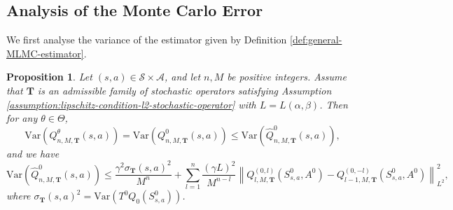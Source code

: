 \documentclass[11pt]{article}
\numberwithin{equation}{section}
\newtheorem{proposition}[theorem]{Proposition}
\theoremstyle{definition}
\theoremstyle{remark}
\begin{document}
\subsection{Analysis of the Monte Carlo Error}
\label{subsection:analysis-mc-error}
We first analyse the variance of the estimator given by Definition \ref{def:general-MLMC-estimator}.
\begin{proposition}
    \label{prop:variance-monte-carlo}
    Let $(s,a) \in \mathcal S \times \mathcal A$, and let $n,M$ be positive integers. Assume that $\mathbf T$ is an admissible family of stochastic operators satisfying Assumption \ref{assumption:lipschitz-condition-l2-stochastic-operator} with $L = L(\alpha, \beta)$.
    Then for any $\theta \in \Theta$,
    \[
        \mathrm{Var} \left(Q _{n,M,\mathbf T} ^{\theta}(s,a)\right) = \mathrm{Var} \left(Q _{n,M,\mathbf T} ^{0}(s,a) \right) \leq \mathrm{Var} \left(\hat{Q} _{n,M,\mathbf T} ^{0}(s,a)\right),
    \]
    and we have
    \begin{equation*}
        \label{eq:monte-carlo-error-final}
        \mathrm{Var} \left(\hat{Q} _{n,M,\mathbf T} ^{0}(s,a)\right)\leq \frac{\gamma^2 \sigma_{\mathbf T}(s,a)^2}{M^n}+ \sum_{l = 1}^n \frac{(\gamma L)^2}{M^{n-l}} \left\| Q_{l,M,\mathbf T} ^{(0,l)} \left(S_{s,a}^{0},A^{0} \right) - Q_{l-1,M,\mathbf T} ^{(0,-l)} \left(S_{s,a}^0,A^{0} \right) \right\|^2_{L^2},
    \end{equation*}
    where $ \sigma_{\mathbf T}(s,a)^2 = \mathrm{Var} \left(T^0 Q_0 (S^0_{s,a}) \right)$.
\end{proposition}
\end{document}
